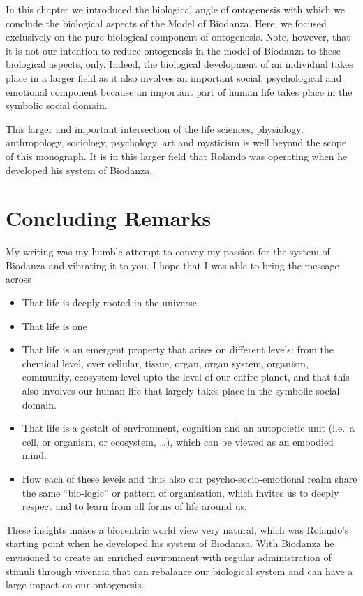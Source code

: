 \documentclass[
  11pt,
]{book}
\begin{document}
In this chapter we introduced the biological angle of ontogenesis with which we conclude the biological aspects of the Model of Biodanza. Here, we focused exclusively on the pure biological component of ontogenesis. Note, however, that it is not our intention to reduce ontogenesis in the model of Biodanza to these biological aspects, only. Indeed, the biological development of an individual takes place in a larger field as it also involves an important social, psychological and emotional component because an important part of human life takes place in the symbolic social domain.

This larger and important intersection of the life sciences, physiology, anthropology, sociology, psychology, art and mysticism is well beyond the scope of this monograph. It is in this larger field that Rolando was operating when he developed his system of Biodanza.

\hypertarget{concluding-remarks}{%
\chapter{Concluding Remarks}\label{concluding-remarks}}

My writing was my humble attempt to convey my passion for the system of Biodanza and vibrating it to you. I hope that I was able to bring the message across

\begin{itemize}
\item
  That life is deeply rooted in the universe
\item
  That life is one
\item
  That life is an emergent property that arises on different levels: from the chemical level, over cellular, tissue, organ, organ system, organism, community, ecosystem level upto the level of our entire planet, and that this also involves our human life that largely takes place in the symbolic social domain.
\item
  That life is a gestalt of environment, cognition and an autopoietic unit (i.e.~a cell, or organism, or ecosystem, \ldots), which can be viewed as an embodied mind.
\item
  How each of these levels and thus also our psycho-socio-emotional realm share the same ``bio-logic'' or pattern of organisation, which invites us to deeply respect and to learn from all forms of life around us.
\end{itemize}

These insights makes a biocentric world view very natural, which was Rolando's starting point when he developed his system of Biodanza. With Biodanza he envisioned to create an enriched environment with regular administration of stimuli through vivencia that can rebalance our biological system and can have a large impact on our ontogenesis.
\end{document}
